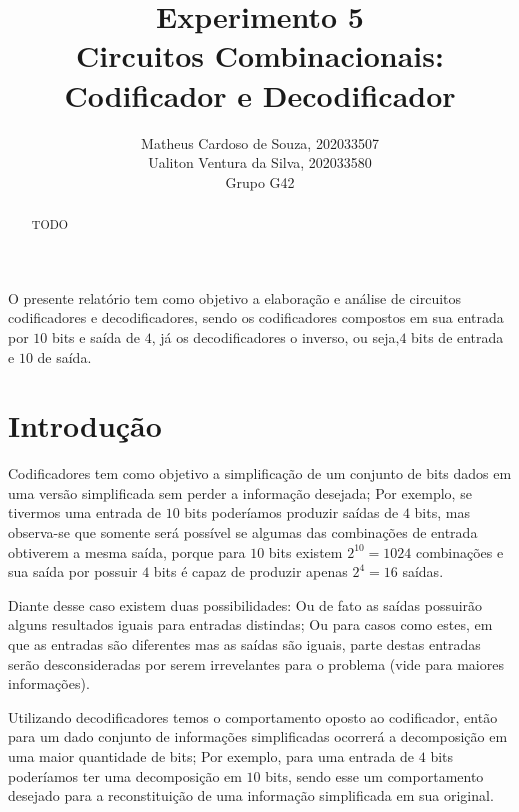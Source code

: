 \documentclass[12pt]{article}
\title{Experimento 5\\
Circuitos Combinacionais: Codificador e Decodificador}
\author{Matheus Cardoso de Souza, 202033507\\
        Ualiton Ventura da Silva, 202033580\\
        Grupo G42
}
\begin{document}
\maketitle

 \begin{abstract}
   TODO
 \end{abstract}

 \begin{resumo}
   O presente relatório tem como objetivo a elaboração e análise de circuitos
   codificadores e decodificadores, sendo os codificadores compostos em sua
   entrada por $10$ bits e saída de $4$, já os decodificadores o inverso, ou
   seja,$4$ bits de entrada e $10$ de saída.
 \end{resumo}


\section{Introdução}
\label{sec:Introducao}


Codificadores tem como objetivo a simplificação de um conjunto de bits dados em
uma versão simplificada sem perder a informação desejada; Por exemplo, se
tivermos uma entrada de $10$ bits poderíamos produzir saídas de $4$ bits, mas
observa-se que somente será possível se algumas das combinações de entrada
obtiverem a mesma saída, porque para $10$ bits existem $2^{10} = 1024$
combinações e sua saída por possuir $4$ bits é capaz de produzir apenas
$2^{4} = 16$ saídas. \cite{codificadores_mandelli}

Diante desse caso existem duas possibilidades: Ou de fato as saídas possuirão
alguns resultados iguais para entradas distindas; Ou para casos como estes, em
que as entradas são diferentes mas as saídas são iguais, parte destas entradas
serão desconsideradas por serem irrevelantes para o problema (vide
\cite{codificadores_e_decodificadores} para maiores informações).

Utilizando decodificadores temos o comportamento oposto ao codificador, então
para um dado conjunto de informações simplificadas ocorrerá a decomposição em
uma maior quantidade de bits; Por exemplo, para uma entrada de $4$ bits
poderíamos ter uma decomposição em $10$ bits, sendo esse um comportamento
desejado para a reconstituição de uma informação simplificada em sua original.
\end{document}
